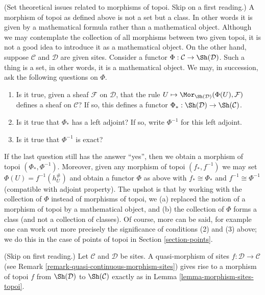 \begin{remark}
\label{remark-morphism-topoi-big}
(Set theoretical issues related to morphisms of topoi. Skip
on a first reading.)
A morphism of topoi as defined above is not a set but a class.
In other words it is given by a mathematical formula rather
than a mathematical object. Although we may contemplate
the collection of all morphisms between two given topoi,
it is not a good idea to introduce it as a mathematical object.
On the other hand, suppose $\mathcal{C}$ and $\mathcal{D}$ are
given sites. Consider a functor
$\Phi : \mathcal{C} \to \Sh(\mathcal{D})$.
Such a thing is a set, in other words, it is a mathematical object.
We may, in succession, ask the following questions on $\Phi$.
\begin{enumerate}
\item Is it true, given a sheaf $\mathcal{F}$ on $\mathcal{D}$,
that the rule
$U \mapsto \Mor_{\Sh(\mathcal{D})}(\Phi(U), \mathcal{F})$
defines a sheaf on $\mathcal{C}$? If so, this defines a functor
$\Phi_* : \Sh(\mathcal{D}) \to \Sh(\mathcal{C})$.
\item Is it true that $\Phi_*$ has a left adjoint? If so,
write $\Phi^{-1}$ for this left adjoint.
\item Is it true that $\Phi^{-1}$ is exact?
\end{enumerate}
If the last question still has the answer ``yes'', then we obtain
a morphism of topoi $(\Phi_*, \Phi^{-1})$. Moreover, given any
morphism of topoi $(f_*, f^{-1})$ we may set
$\Phi(U) = f^{-1}(h_U^\#)$ and obtain a functor $\Phi$ as above
with $f_* \cong \Phi_*$ and $f^{-1} \cong \Phi^{-1}$ (compatible
with adjoint property).
The upshot is that by working with the collection of $\Phi$
instead of morphisms of topoi, we (a) replaced the notion of
a morphism of topoi by a mathematical object, and (b)
the collection of $\Phi$ forms a class (and not a collection
of classes). Of course, more can be said, for example one can work
out more precisely the significance of conditions (2) and (3) above;
we do this in the case of points of topoi in Section \ref{section-points}.
\end{remark}

\begin{remark}
\label{remark-quasi-continuous-morphism-topoi}
(Skip on first reading.)
Let $\mathcal{C}$ and $\mathcal{D}$ be sites.
A quasi-morphism of sites $f : \mathcal{D} \to \mathcal{C}$
(see Remark \ref{remark-quasi-continuous-morphism-sites})
gives rise to a morphism of topoi $f$ from
$\Sh(\mathcal{D})$ to $\Sh(\mathcal{C})$
exactly as in Lemma \ref{lemma-morphism-sites-topoi}.
\end{remark}













